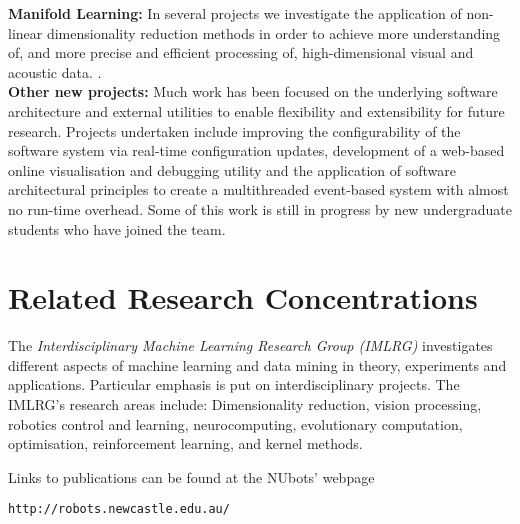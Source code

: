 \documentclass{llncs}
\begin{document}
\noindent\textbf{Manifold Learning:} In several projects we
investigate the application of non-linear dimensionality reduction
methods in order to achieve more understanding of, and more precise
and efficient processing of, high-dimensional visual and acoustic data.
\cite{ChalupEtAl2007b,WongChalup_WCCI_2008,WongEtAl2012}.%
\\

\noindent\textbf{Other new projects:} Much work has been focused on the underlying software architecture and external utilities to enable flexibility and extensibility for future research. Projects undertaken include improving the configurability of the software system via real-time configuration updates, development of a web-based online visualisation and debugging utility \cite{AnnableEtAl2014} and the application of software architectural principles to create a multithreaded event-based system with almost no run-time overhead. Some of this work is still in progress by new undergraduate students who have joined the team.

\section{Related Research Concentrations}

The \emph{Interdisciplinary Machine Learning Research Group (IMLRG)} investigates different aspects of machine learning and data mining in theory, experiments and applications. Particular emphasis is put on interdisciplinary projects. The IMLRG's research areas include: Dimensionality reduction, vision processing, robotics control and learning, neurocomputing, evolutionary computation, optimisation, reinforcement learning, and kernel methods.

\noindent Links to publications can be found at the NUbots' webpage
\begin{center}
\texttt{http://robots.newcastle.edu.au/}
\end{center}



\end{document}
